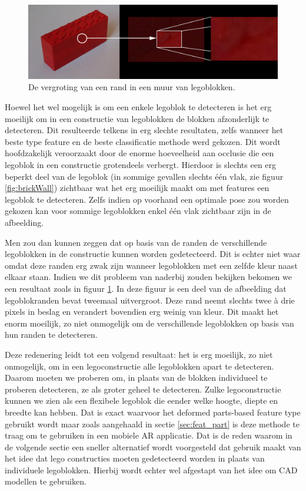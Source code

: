\begin{figure}
  \centering
  \includegraphics[width=\linewidth]{img/edges}
  \caption{De vergroting van een rand in een muur van legoblokken.}
  \label{fig:besl_edges}
\end{figure}

Hoewel het wel mogelijk is om een enkele legoblok te detecteren is het erg moeilijk om in een constructie van legoblokken de blokken afzonderlijk te detecteren. Dit resulteerde telkens in erg slechte resultaten, zelfs wanneer het beste type feature en de beste classificatie methode werd gekozen. Dit wordt hoofdzakelijk veroorzaakt door de enorme hoeveelheid aan occlusie die een legoblok in een constructie grotendeels verbergt. Hierdoor is slechts een erg beperkt deel van de legoblok (in sommige gevallen slechts \'e\'en vlak, zie figuur \ref{fig:brickWall}) zichtbaar wat het erg moeilijk maakt om met features een legoblok te detecteren. Zelfs indien op voorhand een optimale pose zou worden gekozen kan voor sommige legoblokken enkel \'e\'en vlak zichtbaar zijn in de afbeelding. 

Men zou dan kunnen zeggen dat op basis van de randen de verschillende legoblokken in de constructie kunnen worden gedetecteerd. Dit is echter niet waar omdat deze randen erg zwak zijn wanneer legoblokken met een zelfde kleur naast elkaar staan. Indien we dit probleem van naderbij zouden bekijken bekomen we een resultaat zoals in figuur \ref{fig:besl_edges}. In deze figuur is een deel van de afbeelding dat legoblokranden bevat tweemaal uitvergroot. Deze rand neemt slechts twee \`a drie pixels in beslag en verandert bovendien erg weinig van kleur. Dit maakt het enorm moeilijk, zo niet onmogelijk om de verschillende legoblokken op basis van hun randen te detecteren.

Deze redenering leidt tot een volgend resultaat: het is erg moeilijk, zo niet onmogelijk, om in een legoconstructie alle legoblokken apart te detecteren. Daarom moeten we proberen om, in plaats van de blokken individueel te proberen detecteren, ze als groter geheel te detecteren. Zulke legoconstructie kunnen we zien als een flexibele legoblok die eender welke hoogte, diepte en breedte kan hebben. Dat is exact waarvoor het deformed parts-based feature type gebruikt wordt maar zoals aangehaald in sectie \ref{sec:feat_part} is deze methode te traag om te gebruiken in een mobiele AR applicatie. Dat is de reden waarom in de volgende sectie een sneller alternatief wordt voorgesteld dat gebruik maakt van het idee dat lego constructies moeten gedetecteerd worden in plaats van individuele legoblokken. Hierbij wordt echter wel afgestapt van het idee om CAD modellen te gebruiken.

